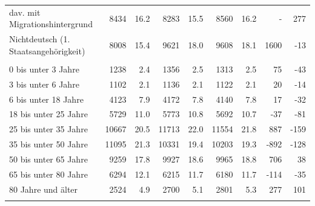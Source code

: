 \documentclass[
  a4paper,
  twoside]{article}
\begin{document}
\begin{table}[!h]
{\begin{threeparttable}
\begin{tabular}[t]{lrrrrrrrr}
\hspace{1em}\hspace{2em}dav. mit Migrationshintergrund & 8434 & 16.2 & 8283 & 15.5 & 8560 & 16.2 & - & 277\\
\hspace{1em}\hspace{1em}Nichtdeutsch (1. Staatsangehörigkeit) & 8008 & 15.4 & 9621 & 18.0 & 9608 & 18.1 & 1600 & -13\\
\addlinespace[0.3em]
\multicolumn{9}{l}{\textcolor[HTML]{044891}{Bevölkerung nach Altersgruppen}}\\
\hspace{1em}\hspace{1em}0 bis unter 3 Jahre & 1238 & 2.4 & 1356 & 2.5 & 1313 & 2.5 & 75 & -43\\
\hspace{1em}\hspace{1em}3 bis unter 6 Jahre & 1102 & 2.1 & 1136 & 2.1 & 1122 & 2.1 & 20 & -14\\
\hspace{1em}\hspace{1em}6 bis unter 18 Jahre & 4123 & 7.9 & 4172 & 7.8 & 4140 & 7.8 & 17 & -32\\
\hspace{1em}\hspace{1em}18 bis unter 25 Jahre & 5729 & 11.0 & 5773 & 10.8 & 5692 & 10.7 & -37 & -81\\
\hspace{1em}\hspace{1em}25 bis unter 35 Jahre & 10667 & 20.5 & 11713 & 22.0 & 11554 & 21.8 & 887 & -159\\
\hspace{1em}\hspace{1em}35 bis unter 50 Jahre & 11095 & 21.3 & 10331 & 19.4 & 10203 & 19.3 & -892 & -128\\
\hspace{1em}\hspace{1em}50 bis unter 65 Jahre & 9259 & 17.8 & 9927 & 18.6 & 9965 & 18.8 & 706 & 38\\
\hspace{1em}\hspace{1em}65 bis unter 80 Jahre & 6294 & 12.1 & 6215 & 11.7 & 6180 & 11.7 & -114 & -35\\
\hspace{1em}\hspace{1em}80 Jahre und älter & 2524 & 4.9 & 2700 & 5.1 & 2801 & 5.3 & 277 & 101\\
\addlinespace[0.3em]

\end{tabular}
\end{threeparttable}}
\end{table}
\end{document}
